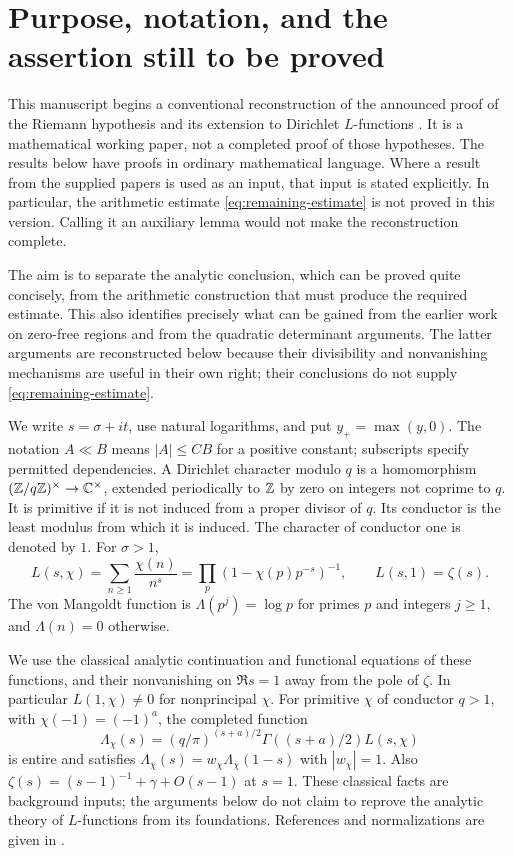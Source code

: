 \section{Purpose, notation, and the assertion still to be proved}
\label{sec:purpose}

This manuscript begins a conventional reconstruction of the announced proof
of the Riemann hypothesis and its extension to Dirichlet $L$-functions
\cite{alpo-announcement}.
It is a mathematical working paper, not a completed proof of those
hypotheses. The results below have proofs in ordinary mathematical
language. Where a result from the supplied papers is used as an input,
that input is stated explicitly. In particular, the arithmetic estimate
\eqref{eq:remaining-estimate} is not proved in this version. Calling it
an auxiliary lemma would not make the reconstruction complete.

The aim is to separate the analytic conclusion, which can be proved quite
concisely, from the arithmetic construction that must produce the required
estimate. This also identifies precisely what can be gained from the
earlier work on zero-free regions and from the quadratic determinant
arguments. The latter arguments are reconstructed below because their
divisibility and nonvanishing mechanisms are useful in their own right;
their conclusions do not supply \eqref{eq:remaining-estimate}.



We write $s=\sigma+it$, use natural logarithms, and put
$y_+=\max(y,0)$. The notation $A\ll B$ means $|A|\le CB$ for a
positive constant; subscripts specify permitted dependencies.
A Dirichlet character modulo $q$ is a homomorphism
$(\mathbb Z/q\mathbb Z)^\times\to\mathbb C^\times$, extended periodically to $\mathbb Z$ by
zero on integers not coprime to $q$. It is primitive if it is not induced
from a proper divisor of $q$. Its conductor is the least modulus from
which it is induced. The character of conductor one is denoted by $1$.
For $\sigma>1$,
\[
 L(s,\chi)=\sum_{n\ge1}\frac{\chi(n)}{n^s}
 =\prod_p(1-\chi(p)p^{-s})^{-1},\qquad L(s,1)=\zeta(s).
\]
The von Mangoldt function is $\Lambda(p^j)=\log p$ for primes $p$
and integers $j\ge1$, and $\Lambda(n)=0$ otherwise.

We use the classical analytic continuation and functional equations of
these functions, and their nonvanishing on $\Re s=1$ away from the
pole of $\zeta$. In particular $L(1,\chi)\ne0$ for nonprincipal
$\chi$. For primitive $\chi$ of conductor $q>1$, with
$\chi(-1)=(-1)^a$, the completed function
\[
 \Lambda_\chi(s)=(q/\pi)^{(s+a)/2}
       \Gamma((s+a)/2)L(s,\chi)
\]
is entire and satisfies
$\Lambda_\chi(s)=w_\chi\Lambda_{\bar\chi}(1-s)$ with
$|w_\chi|=1$. Also
$\zeta(s)=(s-1)^{-1}+\gamma+O(s-1)$ at $s=1$.
These classical facts are background inputs; the arguments below do not
claim to reprove the analytic theory of $L$-functions from its
foundations. References and normalizations are given in
\cite{dlmf-dirichlet,dlmf-zeta,dlmf-zeros}.

